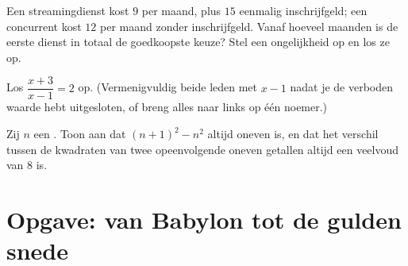 \begin{exercise}[$\star\star$]\label{exo:g10:algebra:9}
Een streamingdienst kost $9$ per maand, plus $15$ eenmalig inschrijfgeld;
een concurrent kost $12$ per maand zonder inschrijfgeld. Vanaf hoeveel
maanden is de eerste dienst in totaal de goedkoopste keuze? Stel een
ongelijkheid op en los ze op.
\end{exercise}

\begin{exercise}[$\star\star$]\label{exo:g10:algebra:10}
Los $\dfrac{x+3}{x-1} = 2$ op. (Vermenigvuldig beide leden met $x - 1$ nadat
je de verboden waarde hebt uitgesloten, of breng alles naar links op één
noemer.)
\end{exercise}

\begin{exercise}[$\star\star\star$]\label{exo:g10:algebra:11}
Zij $n$ een . Toon aan dat $(n + 1)^2 - n^2$ altijd oneven is,
en dat het verschil tussen de kwadraten van twee opeenvolgende oneven
getallen altijd een veelvoud van $8$ is.
\end{exercise}

\section{Opgave: van Babylon tot de gulden snede}

